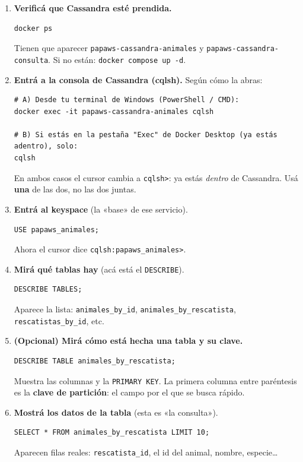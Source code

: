 \documentclass[11pt,a4paper]{article}
\begin{document}
\begin{enumerate}[leftmargin=1.6em]
  \item \textbf{Verificá que Cassandra esté prendida.}
  \begin{lstlisting}[style=shell]
docker ps
  \end{lstlisting}
  {\footnotesize Tienen que aparecer \texttt{papaws-cassandra-animales} y \texttt{papaws-cassandra-consulta}. Si no están: \texttt{docker compose up -d}.}

  \item \textbf{Entrá a la consola de Cassandra (cqlsh).} Según cómo la abras:
  \begin{lstlisting}[style=shell]
# A) Desde tu terminal de Windows (PowerShell / CMD):
docker exec -it papaws-cassandra-animales cqlsh

# B) Si estás en la pestaña "Exec" de Docker Desktop (ya estás adentro), solo:
cqlsh
  \end{lstlisting}
  {\footnotesize En ambos casos el cursor cambia a \texttt{cqlsh>}: ya estás \emph{dentro} de Cassandra. Usá \textbf{una} de las dos, no las dos juntas.}

  \item \textbf{Entrá al keyspace} (la «base» de ese servicio).
  \begin{lstlisting}[style=shell]
USE papaws_animales;
  \end{lstlisting}
  {\footnotesize Ahora el cursor dice \texttt{cqlsh:papaws\_animales>}.}

  \item \textbf{Mirá qué tablas hay} (acá está el \texttt{DESCRIBE}).
  \begin{lstlisting}[style=shell]
DESCRIBE TABLES;
  \end{lstlisting}
  {\footnotesize Aparece la lista: \texttt{animales\_by\_id}, \texttt{animales\_by\_rescatista}, \texttt{rescatistas\_by\_id}, etc.}

  \item \textbf{(Opcional) Mirá cómo está hecha una tabla y su clave.}
  \begin{lstlisting}[style=shell]
DESCRIBE TABLE animales_by_rescatista;
  \end{lstlisting}
  {\footnotesize Muestra las columnas y la \texttt{PRIMARY KEY}. La primera columna entre paréntesis es la \textbf{clave de partición}: el campo por el que se busca rápido.}

  \item \textbf{Mostrá los datos de la tabla} (esta es «la consulta»).
  \begin{lstlisting}[style=shell]
SELECT * FROM animales_by_rescatista LIMIT 10;
  \end{lstlisting}
  {\footnotesize Aparecen filas reales: \texttt{rescatista\_id}, el id del animal, nombre, especie\ldots}


\end{enumerate}
\end{document}
